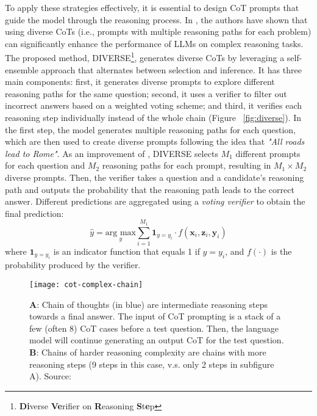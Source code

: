To apply these strategies effectively, it is essential to design CoT prompts that guide the model through the reasoning process.
In \textcite{li2022making}, the authors have shown that using diverse CoTs (i.e., prompts with multiple reasoning paths for each problem) can significantly enhance the performance of LLMs on complex reasoning tasks.
The proposed method, DIVERSE\footnote{\textbf{Di}verse \textbf{Ve}rifier on \textbf{R}easoning \textbf{S}t\textbf{e}p}, generates diverse CoTs by leveraging a self-ensemble approach that alternates between selection and inference.
It has three main components: first, it generates diverse prompts to explore different reasoning paths for the same question; second, it uses a verifier to filter out incorrect answers based on a weighted voting scheme; and third, it verifies each reasoning step individually instead of the whole chain (Figure ~\ref{fig:diverse}).
In the first step, the model generates multiple reasoning paths for each question, which are then used to create diverse prompts following the idea that \textit{"All roads lead to Rome"}.
As an improvement of \textcite{wang2022self}, DIVERSE selects $M_1$ different prompts for each question and $M_2$ reasoning paths for each prompt, resulting in $M_1 \times M_2$ diverse prompts.
Then, the verifier takes a question and a candidate's reasoning path and outputs the probability that the reasoning path leads to the correct answer.
Different predictions are aggregated using a \textit{voting verifier} to obtain the final prediction:
\begin{equation}
	\hat{y} = \underset{y}{\text{arg max}} \sum_{i=1}^{M_1} \textbf{1}_{y = y_{i}} \cdot f(\textbf{x}_i, \textbf{z}_i, \textbf{y}_i)
	\label{eq:diverse}
\end{equation}
where $\textbf{1}_{y = y_{i}}$ is an indicator function that equals 1 if $y = y_{i}$, and $f(\cdot)$ is the probability produced by the verifier.

\begin{figure}[h!]
	\centering
	\texttt{[image: cot-complex-chain]}
	\caption{\textbf{A}: Chain of thoughts (in blue) are intermediate reasoning steps towards a final answer. The input of CoT prompting is a stack of a few (often 8) CoT cases before a test question. Then, the language model will continue generating an output CoT for the test question. \textbf{B}: Chains of harder reasoning complexity are chains with more reasoning steps (9 steps in this case, v.s. only 2 steps in subfigure A). Source: \textcite{fu2022complexity}}
	\label{fig:cot-complex-chain}
\end{figure}

